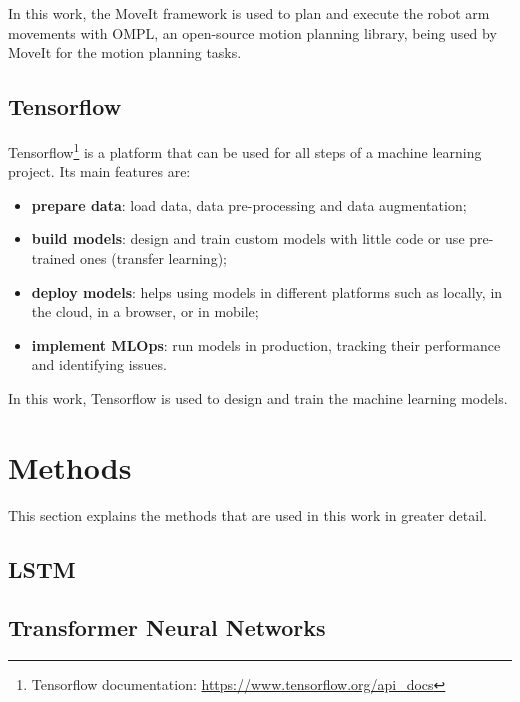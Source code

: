 In this work, the MoveIt framework is used to plan and execute the robot arm movements with OMPL, an open-source motion planning library, being used by MoveIt for the motion planning tasks.

\subsection{Tensorflow}

Tensorflow\footnote{Tensorflow documentation: \url{https://www.tensorflow.org/api_docs}} is a platform that can be used for all steps of a machine learning project. Its main features are:
\begin{itemize}
    \item \textbf{prepare data}: load data, data pre-processing and data augmentation;
    \item \textbf{build models}: design and train custom models with little code or use pre-trained ones (transfer learning);
    \item \textbf{deploy models}: helps using models in different platforms such as locally, in the cloud, in a browser, or in mobile;
    \item \textbf{implement MLOps}: run models in production, tracking their performance and identifying issues.
\end{itemize}

In this work, Tensorflow is used to design and train the machine learning models.

\section{Methods}

This section explains the methods that are used in this work in greater detail.

\subsection{LSTM}

\subsection{Transformer Neural Networks}